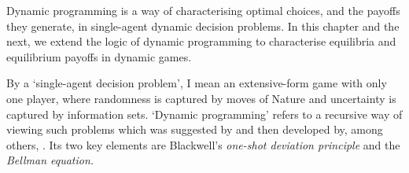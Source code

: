 




Dynamic programming is a way of characterising optimal choices, and the payoffs they generate, in single-agent dynamic decision problems. In this chapter and the next, we extend the logic of dynamic programming to characterise equilibria and equilibrium payoffs in dynamic games.

By a `single-agent decision problem', I mean an extensive-form game with only one player, where randomness is captured by moves of Nature and uncertainty is captured by information sets. `Dynamic programming' refers to a recursive way of viewing such problems which was suggested by \textcite{Bellman1952,Bellman1954,Bellman1957} and then developed by, among others, \textcite{Shapley1953,Karlin1955,Howard1960,Blackwell1962,Blackwell1965}. Its two key elements are Blackwell's \emph{one-shot deviation principle} and the \emph{Bellman equation.}

